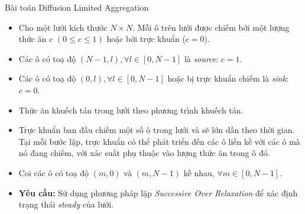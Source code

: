 \begin{frame}{Bài toán Diffusion Limited Aggregation}
\begin{itemize}
	\item Cho một lưới kích thước $N \times N$. Mỗi ô trên lưới được chiếm bởi một lượng thức ăn $c$ $(0 \leq c \leq 1)$ hoặc bởi trực khuẩn ($c = 0$).
	\item Các ô có toạ độ $(N - 1, l), \forall l \in [0, N - 1]$ là \emph{source}: $c = 1$.
	\item Các ô có toạ độ $(0, l), \forall l \in [0, N - 1]$ hoặc bị trực khuẩn chiếm là \emph{sink}: $c = 0$.
	\item Thức ăn khuếch tán trong lưới theo phương trình khuếch tán.
	\item Trực khuẩn ban đầu chiếm một số ô trong lưới và sẽ lớn dần theo thời gian. Tại mỗi bước lặp, trực khuẩn có thể phát triển đến các ô liền kề với các ô mà nó đang chiếm, với xác suất phụ thuộc vào lượng thức ăn trong ô đó.
	\item Coi các ô có toạ độ $(m, 0)$ và $(m, N - 1)$ kề nhau, $\forall m \in [0, N - 1]$.
	\item \textbf{Yêu cầu:} Sử dụng phương pháp lặp \emph{Successive Over Relaxation} để xác định trạng thái \emph{steady} của lưới. 
\end{itemize}
\end{frame}